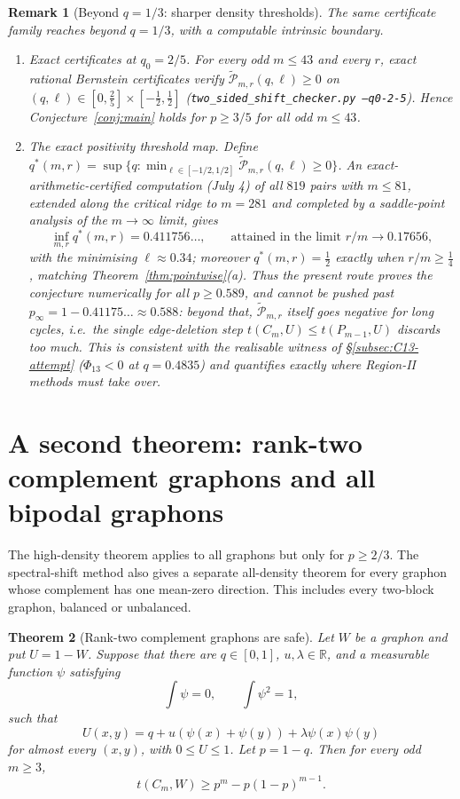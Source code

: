 \documentclass[11pt]{article}
\newtheorem{theorem}{Theorem}[section]
\newtheorem{remark}[theorem]{Remark}
\newcommand{\wtP}{\widetilde{\mathcal P}}
\begin{document}
\begin{remark}[Beyond $q=1/3$: sharper density thresholds]\label{rmk:thresholds}
The same certificate family reaches beyond $q=1/3$, with a computable
intrinsic boundary.
\begin{enumerate}[label=\textup{(\alph*)}]
\item \emph{Exact certificates at $q_0=2/5$.}  For every odd $m\le43$ and
every $r$, exact rational Bernstein certificates verify
$\wtP_{m,r}(q,\ell)\ge0$ on $(q,\ell)\in[0,\tfrac25]\times[-\tfrac12,\tfrac12]$
(\texttt{two\_sided\_shift\_checker.py --q0-2-5}).  Hence
Conjecture~\ref{conj:main} holds for $p\ge3/5$ for all odd $m\le43$.
\item \emph{The exact positivity threshold map.}  Define
$q^*(m,r)=\sup\{q:\min_{\ell\in[-1/2,1/2]}\wtP_{m,r}(q,\ell)\ge0\}$.  An
exact-arithmetic-certified computation (July 4) of all $819$ pairs with
$m\le81$, extended along the critical ridge to $m=281$ and completed by a
saddle-point analysis of the $m\to\infty$ limit, gives
\[
        \inf_{m,r}q^*(m,r)=0.411756\ldots,
        \qquad\text{attained in the limit } r/m\to0.17656,
\]
with the minimising $\ell\approx0.34$; moreover $q^*(m,r)=\tfrac12$ exactly
when $r/m\ge\tfrac14$, matching Theorem~\ref{thm:pointwise}(a).  Thus the
present route proves the conjecture numerically for all $p\ge0.589$, and
\emph{cannot} be pushed past $p_\infty=1-0.41175\ldots\approx0.588$: beyond
that, $\wtP_{m,r}$ itself goes negative for long cycles, i.e.\ the single
edge-deletion step $t(C_m,U)\le t(P_{m-1},U)$ discards too much.  This is
consistent with the realisable witness of \S\ref{subsec:C13-attempt}
($\Phi_{13}<0$ at $q=0.4835$) and quantifies exactly where Region-II methods
must take over.
\end{enumerate}
\end{remark}



\section{A second theorem: rank-two complement graphons and all bipodal graphons}\label{sec:ranktwo}

The high-density theorem applies to all graphons but only for $p\ge2/3$.  The spectral-shift method also gives a separate all-density theorem for every graphon whose complement has one mean-zero direction.  This includes every two-block graphon, balanced or unbalanced.

\begin{theorem}[Rank-two complement graphons are safe]\label{thm:ranktwo}
Let $W$ be a graphon and put $U=1-W$.  Suppose that there are $q\in[0,1]$, $u,\lambda\in\mathbb R$, and a measurable function $\psi$ satisfying
\[
        \int\psi=0,
        \qquad \int\psi^2=1,
\]
such that
\begin{equation}\label{eq:ranktwo-kernel-full}
        U(x,y)=q+u(\psi(x)+\psi(y))+\lambda\psi(x)\psi(y)
\end{equation}
for almost every $(x,y)$, with $0\le U\le1$.  Let $p=1-q$.  Then for every odd $m\ge3$,
\[
        t(C_m,W)\ge p^m-p(1-p)^{m-1}.
\]
\end{theorem}
\end{document}
